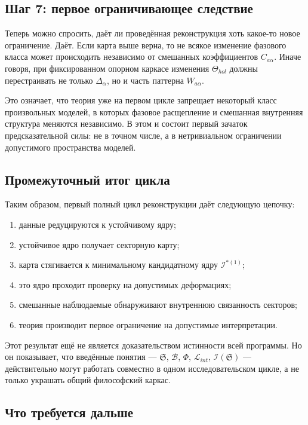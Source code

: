 \documentclass[12pt,a4paper]{article}
\begin{document}
\subsection{Шаг 7: первое ограничивающее следствие}

Теперь можно спросить, даёт ли проведённая реконструкция хоть какое-то новое ограничение. Даёт. Если карта выше верна, то не всякое изменение фазового класса может происходить независимо от смешанных коэффициентов \(C_{a\alpha}\). Иначе говоря, при фиксированном опорном каркасе изменения \(\Theta_{hol}\) должны перестраивать не только \(\Delta_{\alpha}\), но и часть паттерна \(W_{a\alpha}\).

Это означает, что теория уже на первом цикле запрещает некоторый класс произвольных моделей, в которых фазовое расщепление и смешанная внутренняя структура меняются независимо. В этом и состоит первый зачаток предсказательной силы: не в точном числе, а в нетривиальном ограничении допустимого пространства моделей.

\subsection{Промежуточный итог цикла}

Таким образом, первый полный цикл реконструкции даёт следующую цепочку:
\begin{enumerate}
    \item данные редуцируются к устойчивому ядру;
    \item устойчивое ядро получает секторную карту;
    \item карта стягивается к минимальному кандидатному ядру \(\mathcal{I}^{*(1)}\);
    \item это ядро проходит проверку на допустимых деформациях;
    \item смешанные наблюдаемые обнаруживают внутреннюю связанность секторов;
    \item теория производит первое ограничение на допустимые интерпретации.
\end{enumerate}

Этот результат ещё не является доказательством истинности всей программы. Но он показывает, что введённые понятия --- \(\mathfrak{S}\), \(\mathcal{B}\), \(\Phi\), \(\mathcal{L}_{int}\), \(\mathcal{I}(\mathfrak{S})\) --- действительно могут работать совместно в одном исследовательском цикле, а не только украшать общий философский каркас.

\subsection{Что требуется дальше}
\end{document}
